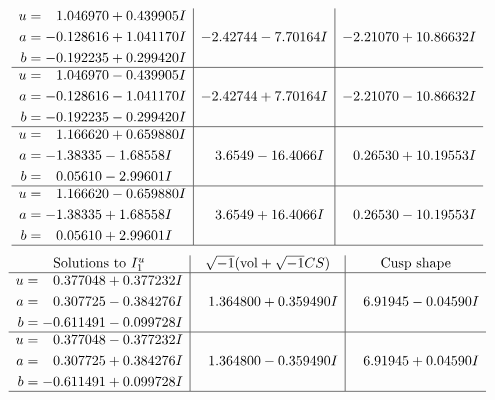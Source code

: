 \documentclass[1p]{elsarticle_modified}
\theoremstyle{definition}
\newcommand{\I}{\sqrt{-1}}
\begin{document}
$$\begin{array}{c|c|c}
\begin{aligned}
u &= \phantom{-}1.046970 + 0.439905 I \\
a &= -0.128616 + 1.041170 I \\
b &= -0.192235 + 0.299420 I\end{aligned}
 & -2.42744 - 7.70164 I & -2.21070 + 10.86632 I \\ \hline\begin{aligned}
u &= \phantom{-}1.046970 - 0.439905 I \\
a &= -0.128616 - 1.041170 I \\
b &= -0.192235 - 0.299420 I\end{aligned}
 & -2.42744 + 7.70164 I & -2.21070 - 10.86632 I \\ \hline\begin{aligned}
u &= \phantom{-}1.166620 + 0.659880 I \\
a &= -1.38335 - 1.68558 I \\
b &= \phantom{-}0.05610 - 2.99601 I\end{aligned}
 & \phantom{-}3.6549 - 16.4066 I & \phantom{-}0.26530 + 10.19553 I \\ \hline\begin{aligned}
u &= \phantom{-}1.166620 - 0.659880 I \\
a &= -1.38335 + 1.68558 I \\
b &= \phantom{-}0.05610 + 2.99601 I\end{aligned}
 & \phantom{-}3.6549 + 16.4066 I & \phantom{-}0.26530 - 10.19553 I\\
 \hline 
 \end{array}$$\newpage$$\begin{array}{c|c|c}  
\text{Solutions to }I^u_{1}& \I (\text{vol} + \sqrt{-1}CS) & \text{Cusp shape}\\
 \hline 
\begin{aligned}
u &= \phantom{-}0.377048 + 0.377232 I \\
a &= \phantom{-}0.307725 - 0.384276 I \\
b &= -0.611491 - 0.099728 I\end{aligned}
 & \phantom{-}1.364800 + 0.359490 I & \phantom{-}6.91945 - 0.04590 I \\ \hline\begin{aligned}
u &= \phantom{-}0.377048 - 0.377232 I \\
a &= \phantom{-}0.307725 + 0.384276 I \\
b &= -0.611491 + 0.099728 I\end{aligned}
 & \phantom{-}1.364800 - 0.359490 I & \phantom{-}6.91945 + 0.04590 I\\
 \hline 
 \end{array}$$\newpage\newpage\renewcommand{\arraystretch}{1}
\end{document}
